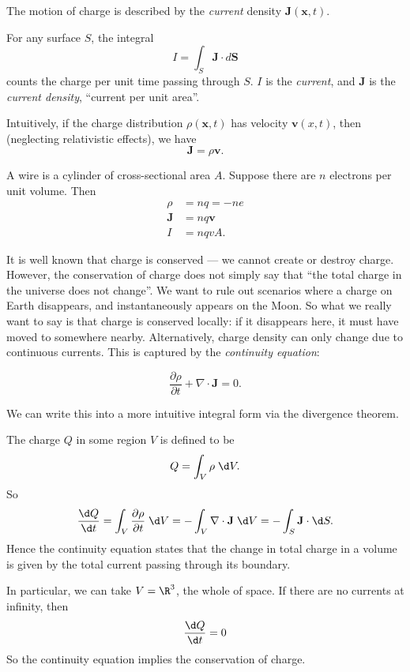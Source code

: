 \documentclass[a4paper]{article}
\begin{document}
The motion of charge is described by the \emph{current} density $\mathbf{J}(\mathbf{x}, t)$.
\begin{defi}
For any surface $S$, the integral
\[
  I = \int_S \mathbf{J}\cdot d\mathbf{S}
\]
counts the charge per unit time passing through $S$. $I$ is the \emph{current}, and $\mathbf{J}$ is the \emph{current density}, ``current per unit area''.
\end{defi}
Intuitively, if the charge distribution $\rho (\mathbf{x}, t)$ has velocity $\mathbf{v}(x, t)$, then (neglecting relativistic effects), we have
\[
  \mathbf{J} = \rho \mathbf{v}.
\]

\begin{eg}
  A wire is a cylinder of cross-sectional area $A$. Suppose there are $n$ electrons per unit volume. Then
  \begin{align*}
    \rho &= nq = -ne\\
    \mathbf{J} &= nq\mathbf{v}\\
    I &= nqvA.
  \end{align*}
\end{eg}

It is well known that charge is conserved --- we cannot create or destroy charge. However, the conservation of charge does not simply say that ``the total charge in the universe does not change''. We want to rule out scenarios where a charge on Earth disappears, and instantaneously appears on the Moon. So what we really want to say is that charge is conserved locally: if it disappears here, it must have moved to somewhere nearby. Alternatively, charge density can only change due to continuous currents. This is captured by the \emph{continuity equation}:
\begin{law}
  \[
    \frac{\partial\rho}{\partial t} + \nabla\cdot \mathbf{J} = 0.
  \]
\end{law}
We can write this into a more intuitive integral form via the divergence theorem.

The charge $Q$ in some region $V$ is defined to be
\[
  Q = \int_V \rho \;\d V.
\]
So
\[
  \frac{\d Q}{\d t} = \int_V \frac{\partial\rho}{\partial t}\; \d V = -\int_V \nabla\cdot \mathbf{J}\; \d V = -\int_S \mathbf{J}\cdot \d S.
\]
Hence the continuity equation states that the change in total charge in a volume is given by the total current passing through its boundary.

In particular, we can take $V = \R^3$, the whole of space. If there are no currents at infinity, then
\[
  \frac{\d Q}{\d t} = 0
\]
So the continuity equation implies the conservation of charge.
\end{document}
